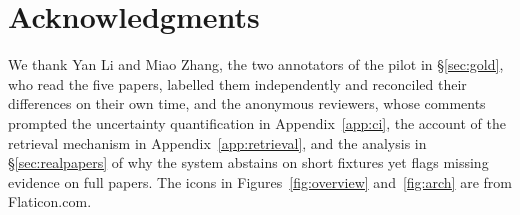 \section*{Acknowledgments}

We thank Yan Li and Miao Zhang, the two annotators of the pilot in
\S\ref{sec:gold}, who read the five papers, labelled them independently and
reconciled their differences on their own time, and the anonymous reviewers,
whose comments prompted the uncertainty
quantification in Appendix~\ref{app:ci}, the account of the retrieval mechanism
in Appendix~\ref{app:retrieval}, and the analysis in \S\ref{sec:realpapers} of
why the system abstains on short fixtures yet flags missing evidence on full
papers. The icons in Figures~\ref{fig:overview} and~\ref{fig:arch} are from
\mbox{Flaticon.com}.
